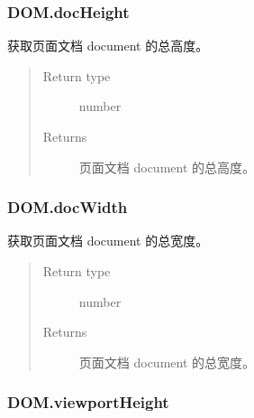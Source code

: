 \documentclass[letterpaper,10pt,english]{sphinxmanual}
\begin{document}
\subsubsection{DOM.docHeight}
\label{api/core/dom/docHeight::doc}\label{api/core/dom/docHeight:dom-docheight}

\begin{fulllineitems}
\label{api/core/dom/docHeight:DOM.docHeight}
获取页面文档 document 的总高度。
\begin{quote}\begin{description}
\item[{Return type}] \leavevmode
number

\item[{Returns}] \leavevmode
页面文档 document 的总高度。

\end{description}\end{quote}

\end{fulllineitems}



\subsubsection{DOM.docWidth}
\label{api/core/dom/docWidth::doc}\label{api/core/dom/docWidth:dom-docwidth}

\begin{fulllineitems}
\label{api/core/dom/docWidth:DOM.docWidth}
获取页面文档 document 的总宽度。
\begin{quote}\begin{description}
\item[{Return type}] \leavevmode
number

\item[{Returns}] \leavevmode
页面文档 document 的总宽度。

\end{description}\end{quote}

\end{fulllineitems}



\subsubsection{DOM.viewportHeight}
\label{api/core/dom/viewportHeight:dom-viewportheight}\label{api/core/dom/viewportHeight::doc}
\end{document}

